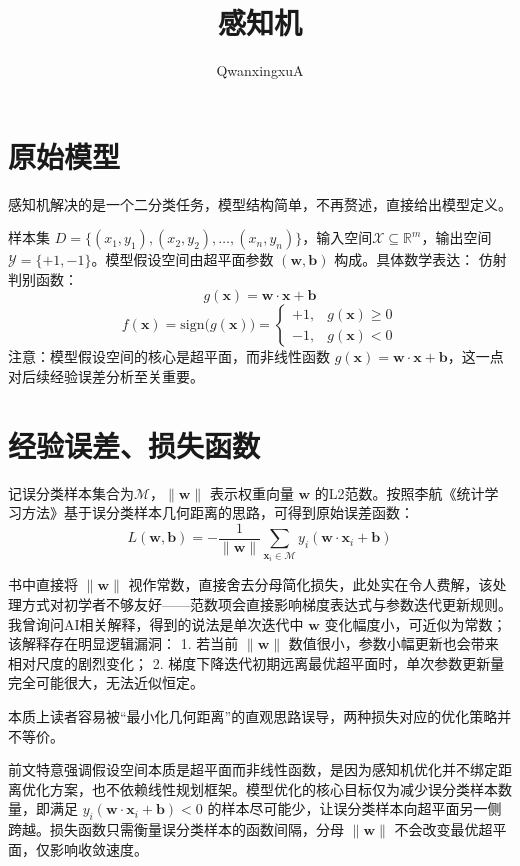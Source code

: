 \documentclass{article}
\title{感知机}
\author{QwanxingxuA}
\begin{document}
\maketitle
\section{原始模型}
感知机解决的是一个二分类任务，模型结构简单，不再赘述，直接给出模型定义。

样本集 $D=\{(x_1,y_1),(x_2,y_2),\dots,(x_n,y_n)\}$，输入空间$\mathcal{X} \subseteq \mathbb R^m$，输出空间$\mathcal{Y} = \{+1,-1\}$。模型假设空间由超平面参数 $(\boldsymbol{w},\boldsymbol{b})$ 构成。具体数学表达：
仿射判别函数：
\[g(\boldsymbol{x})=\boldsymbol{w}\cdot\boldsymbol{x}+\boldsymbol{b}\]
\[f(\boldsymbol{x})=\mathrm{sign}\big(g(\boldsymbol{x})\big)=
\begin{cases}
    +1,& g(\boldsymbol{x})\ge0\\
    -1,& g(\boldsymbol{x})<0
\end{cases}
\]
注意：模型假设空间的核心是超平面，而非线性函数 $g(\boldsymbol{x})=\boldsymbol{w}\cdot\boldsymbol{x}+\boldsymbol{b}$，这一点对后续经验误差分析至关重要。

\section{经验误差、损失函数}
记误分类样本集合为$\mathcal{M}$，$\|\boldsymbol{w}\|$ 表示权重向量 $\boldsymbol{w}$ 的L2范数。按照李航《统计学习方法》基于误分类样本几何距离的思路，可得到原始误差函数：
\[L(\boldsymbol{w},\boldsymbol{b})=-\frac{1}{\|\boldsymbol{w}\|}\sum_{\boldsymbol{x}_i\in \mathcal{M}}y_i(\boldsymbol{w}\cdot \boldsymbol{x}_i+\boldsymbol{b})\]

书中直接将 $\|\boldsymbol{w}\|$ 视作常数，直接舍去分母简化损失，此处实在令人费解，该处理方式对初学者不够友好——范数项会直接影响梯度表达式与参数迭代更新规则。我曾询问AI相关解释，得到的说法是单次迭代中 $\boldsymbol{w}$ 变化幅度小，可近似为常数；该解释存在明显逻辑漏洞：
1. 若当前 $\|\boldsymbol{w}\|$ 数值很小，参数小幅更新也会带来相对尺度的剧烈变化；
2. 梯度下降迭代初期远离最优超平面时，单次参数更新量完全可能很大，无法近似恒定。

本质上读者容易被“最小化几何距离”的直观思路误导，两种损失对应的优化策略并不等价。

前文特意强调假设空间本质是超平面而非线性函数，是因为感知机优化并不绑定距离优化方案，也不依赖线性规划框架。模型优化的核心目标仅为减少误分类样本数量，即满足 $y_i(\boldsymbol{w}\cdot\boldsymbol{x}_i+\boldsymbol{b})<0$ 的样本尽可能少，让误分类样本向超平面另一侧跨越。损失函数只需衡量误分类样本的函数间隔，分母 $\|\boldsymbol{w}\|$ 不会改变最优超平面，仅影响收敛速度。
\end{document}
